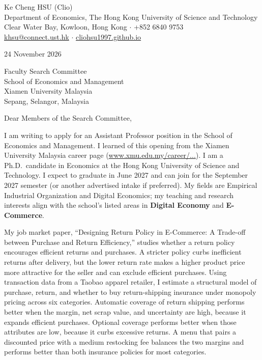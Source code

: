 \documentclass[11pt]{article}
\begin{document}
\begin{flushleft}
Ke Cheng HSU (Clio) \\
Department of Economics, The Hong Kong University of Science and Technology \\
Clear Water Bay, Kowloon, Hong Kong $\cdot$ +852 6840 9753 \\
\href{mailto:khsu@connect.ust.hk}{khsu@connect.ust.hk} $\cdot$ \href{https://cliohsu1997.github.io/}{cliohsu1997.github.io}
\end{flushleft}

24 November 2026

\vspace{0.1em}
Faculty Search Committee \\
School of Economics and Management \\
Xiamen University Malaysia \\
Sepang, Selangor, Malaysia

\vspace{0.1em}
Dear Members of the Search Committee,

I am writing to apply for an Assistant Professor position in the School of Economics and Management. I learned of this opening from the Xiamen University Malaysia career page (\href{https://www.xmu.edu.my/career/school-economics-and-management-professor-associate-professor-assistant-professor-senior}{www.xmu.edu.my/career/...}). I am a Ph.D.\ candidate in Economics at the Hong Kong University of Science and Technology. I expect to graduate in June 2027 and can join for the September 2027 semester (or another advertised intake if preferred). My fields are Empirical Industrial Organization and Digital Economics; my teaching and research interests align with the school's listed areas in \textbf{Digital Economy} and \textbf{E-Commerce}.

My job market paper, ``Designing Return Policy in E-Commerce: A Trade-off between Purchase and Return Efficiency,'' studies whether a return policy encourages efficient returns and purchases. A stricter policy curbs inefficient returns after delivery, but the lower return rate makes a higher product price more attractive for the seller and can exclude efficient purchases. Using transaction data from a Taobao apparel retailer, I estimate a structural model of purchase, return, and whether to buy return-shipping insurance under monopoly pricing across six categories. Automatic coverage of return shipping performs better when the margin, net scrap value, and uncertainty are high, because it expands efficient purchases. Optional coverage performs better when those attributes are low, because it curbs excessive returns. A menu that pairs a discounted price with a medium restocking fee balances the two margins and performs better than both insurance policies for most categories.
\end{document}
